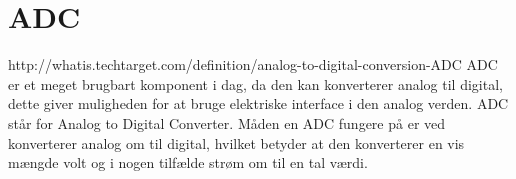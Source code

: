 \section{ADC}

http://whatis.techtarget.com/definition/analog-to-digital-conversion-ADC 
ADC er et meget brugbart komponent i dag, da den kan konverterer analog til digital, dette giver muligheden for at bruge elektriske interface i den analog verden. 
ADC står for Analog to Digital Converter. 
Måden en ADC fungere på er ved konverterer analog om til digital, hvilket betyder at den konverterer en vis mængde volt og i nogen tilfælde strøm om til en tal værdi. 


